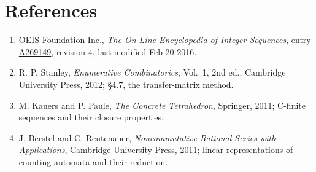 \documentclass[11pt]{article}
\theoremstyle{definition}
\begin{document}
\section{References}

\begin{enumerate}

\item OEIS Foundation Inc., \emph{The On-Line Encyclopedia of Integer Sequences}, entry \href{https://oeis.org/A269149}{A269149}, revision 4, last modified Feb 20 2016.

\item R. P. Stanley, \emph{Enumerative Combinatorics}, Vol.~1, 2nd ed., Cambridge University Press, 2012; \S4.7, the transfer-matrix method.

\item M. Kauers and P. Paule, \emph{The Concrete Tetrahedron}, Springer, 2011; C-finite sequences and their closure properties.

\item J. Berstel and C. Reutenauer, \emph{Noncommutative Rational Series with Applications}, Cambridge University Press, 2011; linear representations of counting automata and their reduction.

\end{enumerate}
\end{document}
